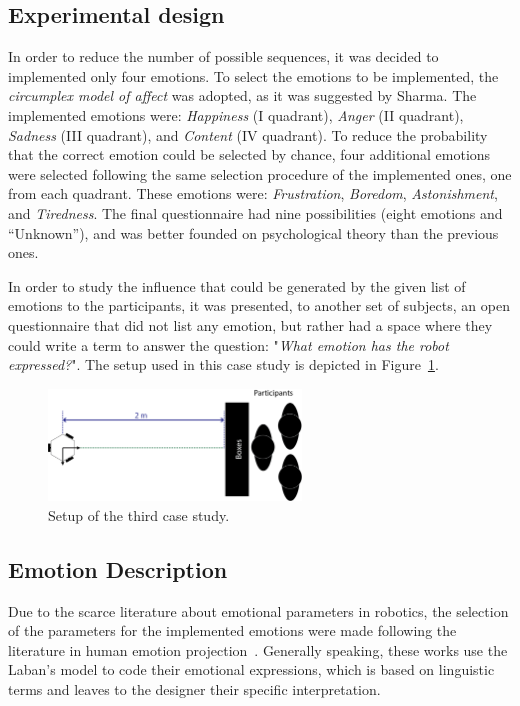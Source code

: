 \subsection{Experimental design}

In order to reduce the number of possible sequences, it was decided to implemented only four emotions. To select the emotions to be implemented, the \textit{circumplex model of affect} was adopted, as it was suggested by Sharma. The implemented emotions were: \textit{Happiness} (I quadrant), \textit{Anger} (II quadrant), \textit{Sadness} (III quadrant), and \textit{Content} (IV quadrant). To reduce the probability that the correct emotion could be selected by chance, four additional emotions were selected following the same selection procedure of the implemented ones, one from each quadrant. These emotions were: \textit{Frustration}, \textit{Boredom}, \textit{Astonishment}, and \textit{Tiredness}. The final questionnaire had nine possibilities (eight emotions and ``Unknown''), and was better founded on psychological theory than the previous ones. 

In order to study the influence that could be generated by the given list of emotions to the participants, it was presented, to another set of subjects, an open questionnaire that did not list any emotion, but rather had a space where they could write a term to answer the question: "\textit{What emotion has the robot expressed?}".
The setup used in this case study is depicted in Figure~\ref{fig:setup2}.

\begin{figure}[h]
	\centering
	\includegraphics[width=0.6\textwidth]{./Images/ThirdCase.png} 
	\caption{Setup of the third case study.}
	\label{fig:setup2} 
\end{figure}

\subsection{Emotion Description} 

Due to the scarce literature about emotional parameters in robotics, the selection of the parameters for the implemented emotions were made following the literature in human emotion projection~\cite{Nadia2013, Crane2013}.
Generally speaking, these works use the Laban's model to code their emotional expressions, which is based on linguistic terms and leaves to the designer their specific interpretation.

